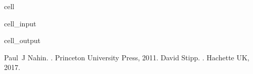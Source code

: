 \documentclass[letterpaper,10pt,english]{jupyterBook}
\begin{document}
\begin{sphinxuseclass}{cell}\begin{sphinxVerbatimInput}

\begin{sphinxuseclass}{cell_input}
\begin{sphinxVerbatim}[commandchars=\\\{\}]
\end{sphinxVerbatim}

\end{sphinxuseclass}\end{sphinxVerbatimInput}
\begin{sphinxVerbatimOutput}

\begin{sphinxuseclass}{cell_output}
\begin{sphinxVerbatim}
\end{sphinxVerbatim}

\noindent{}

\end{sphinxuseclass}\end{sphinxVerbatimOutput}

\end{sphinxuseclass}
\begin{sphinxthebibliography}{1}
\sphinxAtStartPar
Paul J Nahin. . Princeton University Press, 2011.
\sphinxAtStartPar
David Stipp. . Hachette UK, 2017.
\end{sphinxthebibliography}







\renewcommand{\indexname}{Index}
\printindex
\end{document}
